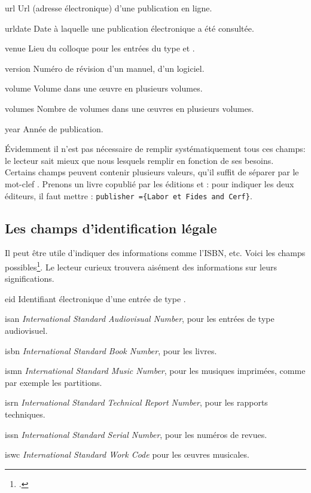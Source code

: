 \begin{choix}
	\item[url] Url (adresse électronique) d'une publication en ligne. 
   	\item[urldate] Date à laquelle une publication électronique a été consultée. 
   	\item[venue] Lieu du colloque pour les entrées du type  et . 
   	\item[version] Numéro de révision d'un manuel, d'un logiciel. 
   	\item[volume] Volume dans une œuvre en plusieurs volumes. 
   	\item[volumes] Nombre de volumes dans une œuvres en plusieurs volumes. 
   	\item[year] Année de publication. 				
\end{choix}


Évidemment il n'est pas nécessaire de remplir  systématiquement tous ces champs: le lecteur sait mieux que nous lesquels remplir en fonction de ses besoins. Certains champs peuvent contenir plusieurs valeurs, qu'il suffit de séparer par le mot-clef . Prenons un livre copublié par les éditions  et  : pour indiquer les deux éditeurs, il faut mettre : \verb|publisher ={Labor et Fides and Cerf}|.




\subsection{Les champs d'identification légale}

Il peut être utile d'indiquer des informations comme l'ISBN, etc. Voici les champs possibles\footcite[Par défaut,  imprime ces champs s'ils sont remplis. Il est toutefois possible de ne pas les afficher en passant l'option  au chargement du package, voir:][]{biblatex_isbn}.  Le lecteur curieux trouvera aisément des informations sur leurs significations.

\begin{choix}
	\item[eid] Identifiant électronique d'une entrée de type . 
   	\item[isan] \emph{\textenglish{International Standard Audiovisual Number}}, pour les entrées de type audiovisuel.
   	\item[isbn] \emph{\textenglish{International Standard Book Number}}, pour les livres. 
   	\item[ismn] \emph{\textenglish{International Standard Music Number}}, pour les musiques imprimées, comme par exemple les partitions. 
   	\item[isrn] \emph{\textenglish{International Standard Technical Report Number}}, pour les rapports techniques. 
   	\item[issn] \emph{\textenglish{International Standard Serial Number}}, pour les numéros de revues. 
   	\item[iswc] \emph{\textenglish{International Standard Work Code}} pour les œuvres musicales.
\end{choix}

